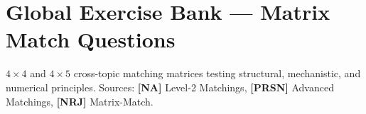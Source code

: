 \chapter*{Global Exercise Bank --- Matrix Match Questions}
\label{chap:matrix_match}

\begin{tcolorbox}[enhanced,colback=subtlegreen,colframe=cengagegreen,arc=2mm,boxrule=1pt,
    title=\textbf{\large Multi-Concept Matrix Matching Problems (All Chapters)}]
$4 \times 4$ and $4 \times 5$ cross-topic matching matrices testing structural, mechanistic, and numerical principles.
Sources: \textbf{[NA]} Level-2 Matchings, \textbf{[PRSN]} Advanced Matchings, \textbf{[NRJ]} Matrix-Match.
\end{tcolorbox}

